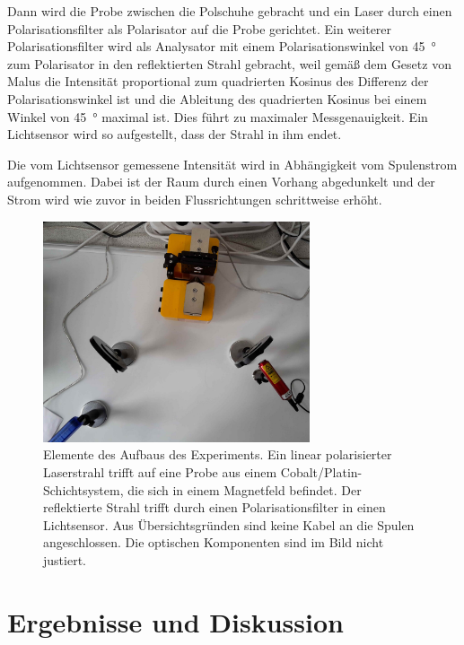 \documentclass[
	a4paper,
	12pt,
	pagesize,
	ngerman
]{scrartcl}
\begin{document}
	Dann wird die Probe zwischen die Polschuhe gebracht und ein Laser durch einen Polarisationsfilter als Polarisator auf die Probe gerichtet.
	Ein weiterer Polarisationsfilter wird als Analysator mit einem Polarisationswinkel von \SI{45}{\degree} zum Polarisator in den reflektierten Strahl gebracht, weil gemäß dem Gesetz von Malus die Intensität proportional zum quadrierten Kosinus des Differenz der Polarisationswinkel ist und die Ableitung des quadrierten Kosinus bei einem Winkel von \SI{45}{\degree} maximal ist.
	Dies führt zu maximaler Messgenauigkeit. %
	Ein Lichtsensor wird so aufgestellt, dass der Strahl in ihm endet.
	
	Die vom Lichtsensor gemessene Intensität wird in Abhängigkeit vom Spulenstrom aufgenommen.
	Dabei ist der Raum durch einen Vorhang abgedunkelt und der Strom wird wie zuvor in beiden Flussrichtungen schrittweise erhöht.
	
	\begin{figure}[H] 
		\includegraphics[width=0.7\textwidth]{O4_Aufbau} %
		\centering
		\caption{Elemente des Aufbaus des Experiments. Ein linear polarisierter Laserstrahl trifft auf eine Probe aus einem Cobalt/Platin-Schichtsystem, die sich in einem Magnetfeld befindet. Der reflektierte Strahl trifft durch einen Polarisationsfilter in einen Lichtsensor. Aus Übersichtsgründen sind keine Kabel an die Spulen angeschlossen. Die optischen Komponenten sind im Bild nicht justiert.} 
		\label{fig_aufbau}
		\centering
	\end{figure}
	
	\section{Ergebnisse und Diskussion}
	
\end{document}
